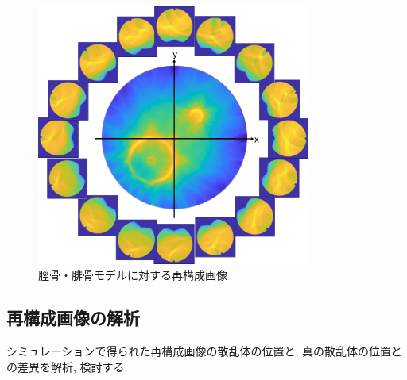 \begin{figure}[H]
  \begin{center}
    \includegraphics[width=90mm]{fig/hikotsu16.pdf}
  \end{center}
  \caption{脛骨・腓骨モデルに対する再構成画像}
\end{figure}
\subsection{再構成画像の解析}
シミュレーションで得られた再構成画像の散乱体の位置と, 真の散乱体の位置との差異を解析, 検討する. 
